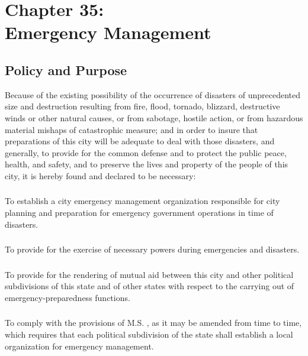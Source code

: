 \chapter*{Chapter 35: \\
	Emergency Management}
    \minitoc
    \pagebreak

\section{Policy and Purpose}
Because of the existing possibility of the occurrence of disasters of unprecedented size and destruction resulting from fire, flood, tornado, blizzard, destructive winds or other natural causes, or from sabotage, hostile action, or from hazardous material mishaps of catastrophic measure; and in order to insure that preparations of this city will be adequate to deal with those disasters, and generally, to provide for the common defense and to protect the public peace, health, and safety, and to preserve the lives and property of the people of this city, it is hereby found and declared to be necessary:
\subsection{}
To establish a city emergency management organization responsible for city planning and preparation for emergency government operations in time of disasters.
\subsection{}
To provide for the exercise of necessary powers during emergencies and disasters.
\subsection{}
To provide for the rendering of mutual aid between this city and other political subdivisions of this state and of other states with respect to the carrying out of emergency-preparedness functions.
\subsection{}
To comply with the provisions of M.S. , as it may be amended from time to time, which requires that each political subdivision of the state shall establish a local organization for emergency management.

